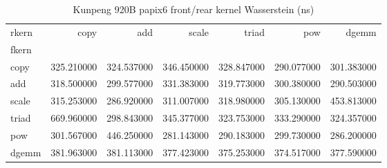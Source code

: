 \begin{table}
\caption{Kunpeng 920B papix6 front/rear kernel Wasserstein (ns)}
\begin{tabular}{lrrrrrr}
\toprule
rkern & copy & add & scale & triad & pow & dgemm \\
fkern &  &  &  &  &  &  \\
\midrule
copy & 325.210000 & 324.537000 & 346.450000 & 328.847000 & 290.077000 & 301.383000 \\
add & 318.500000 & 299.577000 & 331.383000 & 319.773000 & 300.380000 & 290.503000 \\
scale & 315.253000 & 286.920000 & 311.007000 & 318.980000 & 305.130000 & 453.813000 \\
triad & 669.960000 & 298.843000 & 345.377000 & 323.753000 & 333.290000 & 324.357000 \\
pow & 301.567000 & 446.250000 & 281.143000 & 290.183000 & 299.730000 & 286.200000 \\
dgemm & 381.963000 & 381.113000 & 377.423000 & 375.253000 & 374.517000 & 377.590000 \\
\bottomrule
\end{tabular}
\end{table}
